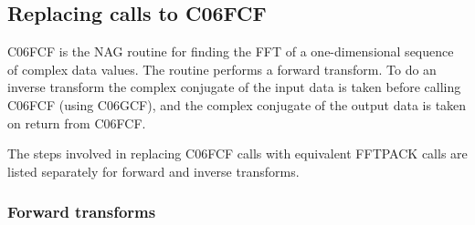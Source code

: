\documentclass[11pt,twoside,nolof]{starlink}
\begin{document}

\subsection{Replacing calls to C06FCF}

   C06FCF is the NAG routine for finding the FFT of a one-dimensional
   sequence of complex data values. The routine performs a forward
   transform. To do an inverse transform the complex conjugate of the
   input data is taken before calling C06FCF (using C06GCF), and the
   complex conjugate of the output data is taken on return from C06FCF.

   The steps involved in replacing C06FCF calls with
   equivalent FFTPACK calls are listed separately for forward and
   inverse transforms.


\subsubsection{Forward transforms}
\end{document}
